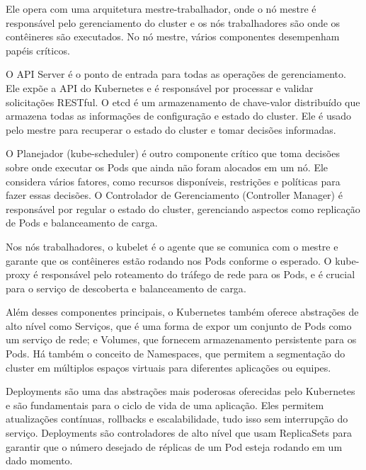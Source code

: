 Ele opera com uma arquitetura mestre-trabalhador, onde o nó mestre é responsável pelo gerenciamento do cluster e os nós trabalhadores são onde os contêineres são executados\cite{kubernetes2017orchestration}. No nó mestre, vários componentes desempenham papéis críticos.

O API Server é o ponto de entrada para todas as operações de gerenciamento. Ele expõe a API do Kubernetes e é responsável por processar e validar solicitações RESTful\cite{kubernetes2017orchestration}. O etcd é um armazenamento de chave-valor distribuído que armazena todas as informações de configuração e estado do cluster\cite{han2021tailored}. Ele é usado pelo mestre para recuperar o estado do cluster e tomar decisões informadas.

O Planejador (kube-scheduler) é outro componente crítico que toma decisões sobre onde executar os Pods que ainda não foram alocados em um nó\cite{han2021tailored}. Ele considera vários fatores, como recursos disponíveis, restrições e políticas para fazer essas decisões. O Controlador de Gerenciamento (Controller Manager) é responsável por regular o estado do cluster, gerenciando aspectos como replicação de Pods e balanceamento de carga\cite{kubernetes2017orchestration}.

Nos nós trabalhadores, o kubelet é o agente que se comunica com o mestre e garante que os contêineres estão rodando nos Pods conforme o esperado\cite{kubernetes2017orchestration}. O kube-proxy é responsável pelo roteamento do tráfego de rede para os Pods, e é crucial para o serviço de descoberta e balanceamento de carga\cite{kubernetes2017orchestration}.

Além desses componentes principais, o Kubernetes também oferece abstrações de alto nível como Serviços, que é uma forma de expor um conjunto de Pods como um serviço de rede; e Volumes, que fornecem armazenamento persistente para os Pods\cite{han2021tailored}. Há também o conceito de Namespaces, que permitem a segmentação do cluster em múltiplos espaços virtuais para diferentes aplicações ou equipes\cite{kubernetes2017orchestration}.

Deployments são uma das abstrações mais poderosas oferecidas pelo Kubernetes e são fundamentais para o ciclo de vida de uma aplicação. Eles permitem atualizações contínuas, rollbacks e escalabilidade, tudo isso sem interrupção do serviço. Deployments são controladores de alto nível que usam ReplicaSets para garantir que o número desejado de réplicas de um Pod esteja rodando em um dado momento\cite{hands2019microservices}.

